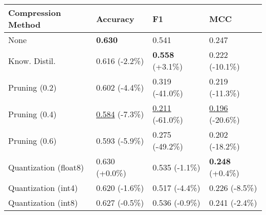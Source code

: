 \begin{tabular}{llll}
\toprule
\textbf{Compression Method} & \textbf{Accuracy} & \textbf{F1} & \textbf{MCC} \\
\midrule
None & \textbf{0.630} & 0.541 & 0.247 \\
Know. Distil. & 0.616 (-2.2\%) & \textbf{0.558} (+3.1\%) & 0.222 (-10.1\%) \\
Pruning (0.2) & 0.602 (-4.4\%) & 0.319 (-41.0\%) & 0.219 (-11.3\%) \\
Pruning (0.4) & \underline{0.584} (-7.3\%) & \underline{0.211} (-61.0\%) & \underline{0.196} (-20.6\%) \\
Pruning (0.6) & 0.593 (-5.9\%) & 0.275 (-49.2\%) & 0.202 (-18.2\%) \\
Quantization (float8) & 0.630 (+0.0\%) & 0.535 (-1.1\%) & \textbf{0.248} (+0.4\%) \\
Quantization (int4) & 0.620 (-1.6\%) & 0.517 (-4.4\%) & 0.226 (-8.5\%) \\
Quantization (int8) & 0.627 (-0.5\%) & 0.536 (-0.9\%) & 0.241 (-2.4\%) \\
\bottomrule
\end{tabular}
